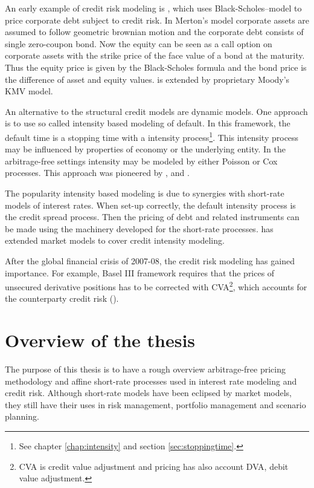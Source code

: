 An early example of credit risk modeling is \textcite{merton1974pricing}, which uses Black-Scholes--model to price corporate debt subject to credit risk. In Merton's model corporate assets are assumed to follow geometric brownian motion and the corporate debt consists of single zero-coupon bond. Now the equity can be seen as a call option on corporate assets with the strike price of the face value of a bond at the maturity. Thus the equity price is given by the Black-Scholes formula and the bond price is the difference of asset and equity values. \textcite{merton1974pricing} is extended by proprietary Moody's KMV model. 

An alternative to the structural credit models are dynamic models. One approach is to use so called intensity based modeling of default. In this framework, the default time is a stopping time with a intensity process\footnote{See chapter \ref{chap:intensity} and section \ref{sec:stoppingtime}.}. This intensity process may be influenced by properties of economy or the underlying entity. In the arbitrage-free settings intensity may be modeled by either Poisson or Cox processes. This approach was pioneered by \textcite{artzner1995default}, \textcite{jarrow1995pricing} and \textcite{lando1998cox}.

The popularity intensity based modeling is due to synergies with short-rate models of interest rates. When set-up correctly, the default intensity process is the credit spread process. Then the pricing of debt and related instruments can be made using the machinery developed for the short-rate processes. \textcite{schonbucher2001libor} has extended market models to cover credit intensity modeling.

After the global financial crisis of 2007-08, the credit risk modeling has gained importance. For example, Basel III framework requires that the prices of unsecured derivative positions has to be corrected with CVA\footnote{CVA is credit value adjustment and pricing has also account DVA, debit value adjustment.}, which accounts for the counterparty credit risk (\cite{basel2015cva}).

\section{Overview of the thesis}

The purpose of this thesis is to have a rough overview arbitrage-free pricing methodology and affine short-rate processes used in interest rate modeling and credit risk. Although short-rate models have been eclipsed by market models, they still have their uses in risk management, portfolio management and scenario planning.

